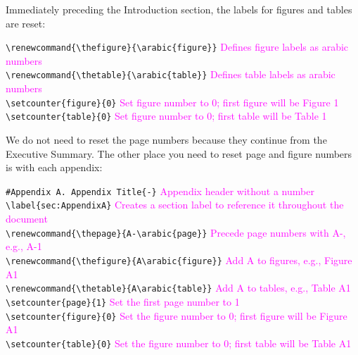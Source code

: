 \documentclass[12pt,]{article}
\begin{document}
\vspace{.5cm}

Immediately preceding the Introduction section, the labels for figures
and tables are reset:

\texttt{\textbackslash{}renewcommand\{\textbackslash{}thefigure\}\{\textbackslash{}arabic\{figure\}\}}
\textcolor{magenta}{Defines figure labels as arabic numbers}\\
\texttt{\textbackslash{}renewcommand\{\textbackslash{}thetable\}\{\textbackslash{}arabic\{table\}\}}
\textcolor{magenta}{Defines table labels as arabic numbers}\\
\texttt{\textbackslash{}setcounter\{figure\}\{0\}}
\textcolor{magenta}{Set figure number to 0; first figure will be Figure 1}\\
\texttt{\textbackslash{}setcounter\{table\}\{0\}}
\textcolor{magenta}{Set figure number to 0; first table will be Table 1}

\vspace{.5cm}

We do not need to reset the page numbers because they continue from the
Executive Summary. The other place you need to reset page and figure
numbers is with each appendix:

\texttt{\#Appendix\ A.\ Appendix\ Title\{-\}}
\textcolor{magenta}{Appendix header without a number}\\
\texttt{\textbackslash{}label\{sec:AppendixA\}}
\textcolor{magenta}{Creates a section label to reference it throughout the document}\\
\texttt{\textbackslash{}renewcommand\{\textbackslash{}thepage\}\{A-\textbackslash{}arabic\{page\}\}}
\textcolor{magenta}{Precede page numbers with A-, e.g., A-1}\\
\texttt{\textbackslash{}renewcommand\{\textbackslash{}thefigure\}\{A\textbackslash{}arabic\{figure\}\}}
\textcolor{magenta}{Add A to figures, e.g., Figure A1}\\
\texttt{\textbackslash{}renewcommand\{\textbackslash{}thetable\}\{A\textbackslash{}arabic\{table\}\}}
\textcolor{magenta}{Add A to tables, e.g., Table A1}\\
\texttt{\textbackslash{}setcounter\{page\}\{1\}}
\textcolor{magenta}{Set the first page number to 1}\\
\texttt{\textbackslash{}setcounter\{figure\}\{0\}}
\textcolor{magenta}{Set the figure number to 0; first figure will be Figure A1}\\
\texttt{\textbackslash{}setcounter\{table\}\{0\}}
\textcolor{magenta}{Set the figure number to 0; first table will be Table A1}
\end{document}
